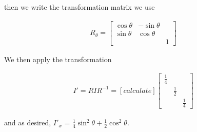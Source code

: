 \documentclass{article}
\begin{document}
then we write the transformation matrix we use

\begin{align}
R_{\theta}
=
\begin{bmatrix} \cos\theta & -\sin\theta & \\ \sin\theta & \cos\theta &  \\  &  & 1  \end{bmatrix}
\end{align}

We then apply the transformation

\begin{align}
I' = RIR^{-1}
= [calculate]
\begin{bmatrix} \frac{1}{4} &  & \\  & \frac{1}{2} &  \\  &  & \frac{1}{4}  \end{bmatrix}
\end{align}

and as desired, $I'_{x}$ = $\frac{1}{4}\sin^2\theta + \frac{1}{2}\cos^2\theta$.
\end{document}
